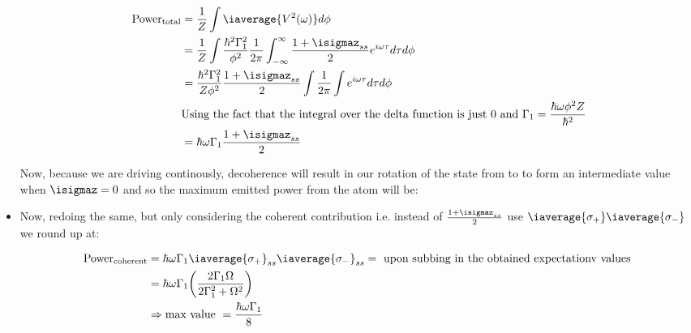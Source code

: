 \begin{itemize}
 	\begin{equation}\label{feb220183}
 	\begin{aligned}
 	\text{Power}_\text{total} &= \frac{1}{Z}\int 	\iaverage{V^2(\omega)}  d\phi\\
 	& = \frac{1}{Z}\int \frac{\hbar^2\Gamma_1^{2}}{\phi^2}\frac{1}{2\pi}\int_{-\infty}^{\infty} \frac{1+{\isigmaz}_{ss}}{2} e^{i\omega \tau}d\tau   d\phi\\
 	& = \frac{\hbar^2\Gamma_1^2}{Z\phi^2} \frac{1+{\isigmaz}_{ss}}{2} \int\frac{1}{2\pi}\int e^{i\omega\tau}d\tau d\phi\\
 	& \text{Using the fact that the integral over the delta function is just 0 and } \Gamma_1 = \frac{\hbar\omega\phi^2Z}{\hbar^2}\\
 	& = \hbar\omega\Gamma_1  \frac{1+{\isigmaz}_{ss}}{2}
 	\end{aligned}
 	\end{equation}
 	
 	\noindent Now, because we are driving continously, decoherence will result in our rotation of the state from  to  to form an intermediate value when $ \isigmaz = 0 $ and so the maximum emitted power from the atom will be:
 	
 	
 	
 	\item Now, redoing the same, but only considering the coherent contribution i.e. instead of $  \frac{1+{\isigmaz}_{ss}}{2} $ use $ \iaverage{\sigma_{+}}\iaverage{\sigma_{-}} $ we round up at:
 	
 	\begin{equation}\label{maximalCoherentEmission}
 	\begin{aligned}
 	\text{Power}_\text{coherent} &= \hbar\omega\Gamma_1 \iaverage{\sigma_{+}}_{ss} \iaverage{\sigma_{-}}_{ss} = \text{ upon subbing in the obtained expectationv values }\\
 	& = \hbar\omega\Gamma_1\bigg(\frac{2\Gamma_1\Omega}{2\Gamma_1^2+\Omega^2}\bigg)\\&\Rightarrow \text{max value } = \frac{\hbar\omega\Gamma_1}{8}
 	\end{aligned}
 	\end{equation}
 	

\end{itemize}
